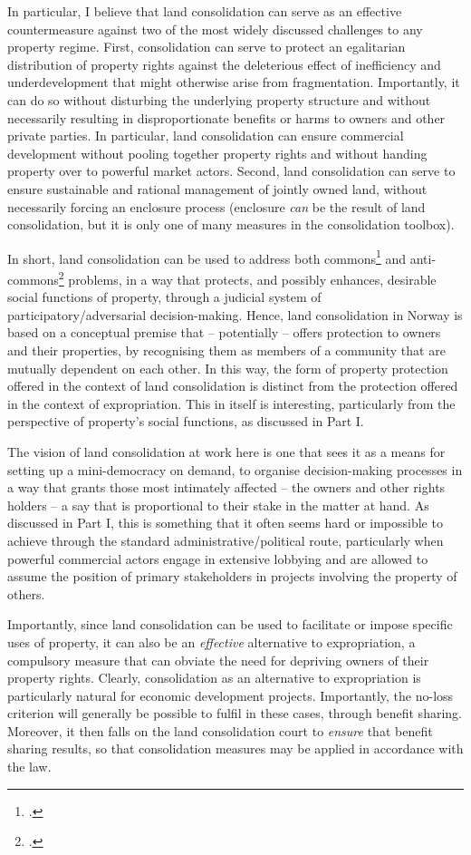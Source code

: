 In particular, I believe that land consolidation can serve as an effective countermeasure against two of the most widely discussed challenges to any property regime. First, consolidation can serve to protect an egalitarian distribution of property rights against the deleterious effect of inefficiency and underdevelopment that might otherwise arise from fragmentation. Importantly, it can do so without disturbing the underlying property structure and without necessarily resulting in disproportionate benefits or harms to owners and other private parties. In particular, land consolidation can ensure commercial development without pooling together property rights and without handing property over to powerful market actors. Second, land consolidation can serve to ensure sustainable and rational management of jointly owned land, without necessarily forcing an enclosure process (enclosure {\it can} be the result of land consolidation, but it is only one of many measures in the consolidation toolbox).

In short, land consolidation can be used to address both commons\footcite{hardin68} and anti-commons\footcite{heller98} problems, in a way that protects, and possibly enhances, desirable social functions of property, through a judicial system of participatory/adversarial decision-making. Hence, land consolidation in Norway is based on a conceptual premise that -- potentially -- offers protection to owners and their properties, by recognising them as members of a community that are mutually dependent on each other. In this way, the form of property protection offered in the context of land consolidation is distinct from the protection offered in the context of expropriation. This in itself is interesting, particularly from the perspective of property's social functions, as discussed in Part I.

The vision of land consolidation at work here is one that sees it as a means for setting up a mini-democracy on demand, to organise decision-making processes in a way that grants those most intimately affected -- the owners and other rights holders -- a say that is proportional to their stake in the matter at hand. As discussed in Part I, this is something that it often seems hard or impossible to achieve through the standard administrative/political route, particularly when powerful commercial actors engage in extensive lobbying and are allowed to assume the position of primary stakeholders in projects involving the property of others.

Importantly, since land consolidation can be used to facilitate or impose specific uses of property, it can also be an {\it effective} alternative to expropriation, a compulsory measure that can obviate the need for depriving owners of their property rights. Clearly, consolidation as an alternative to expropriation is particularly natural for economic development projects. Importantly, the no-loss criterion will generally be possible to fulfil in these cases, through benefit sharing. Moreover, it then falls on the land consolidation court to {\it ensure} that benefit sharing results, so that consolidation measures may be applied in accordance with the law.

